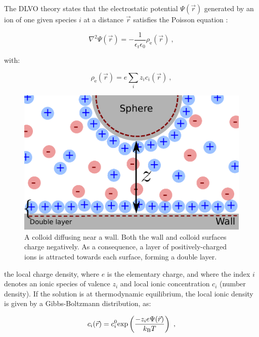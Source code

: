 The DLVO theory states that the electrostatic potential $\Psi(\vec{r})$ generated by an ion of one given species $i$ at a distance $\vec{r}$ satisfies the Poisson equation \cite{israelachvili_intermolecular_2015}:

\begin{equation}
	\nabla ^2 \Psi(\vec{r}) = -\frac{1}{\epsilon_\mathrm{r} \epsilon_0}  \rho_\mathrm{e}(\vec{r})~,
	\label{Eq:poisson}
\end{equation}

with:

\begin{equation}
	\rho_\mathrm{e}(\vec{r}) = e \sum _i z_i c_i (\vec{r}) ~,
	\label{Eq.3}
\end{equation}

\begin{figure}
	\includegraphics{02_body/chapter3/images/double_layer.pdf}
	\caption{A colloid diffusing near a wall. Both the wall and colloid surfaces charge negatively. As a consequence, a layer of positively-charged ions is attracted towards each surface, forming a double layer.}
	\label{Fig:double_layer}
\end{figure}


the local charge density, where $e$ is the elementary charge, and where the index $i$ denotes an ionic species of valence $z_i$ and local ionic concentration $c_i$ (number density). If the solution is at thermodynamic equilibrium, the local ionic density is given by a Gibbs-Boltzmann distribution, as:

\begin{equation}
	c_i(\vec{r}) = c_i ^0 \textnormal{exp}\left(\frac{-z_i e \Psi(\vec{r})}{k_\mathrm{B} T }\right) ~,
	\label{Eq.4}
\end{equation}



